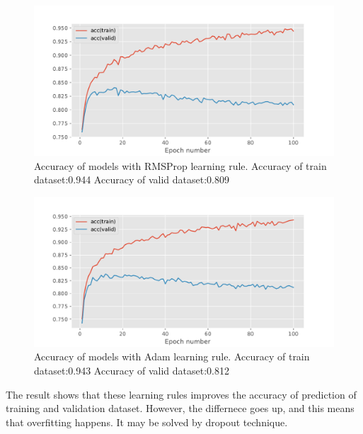 \documentclass{article}
\begin{document}
\begin{figure}[h]
\vskip 5mm
\begin{center}
\centerline{\includegraphics[width=\columnwidth]{d.pdf}}
\caption{Accuracy of models with RMSProp learning rule.
Accuracy of train dataset:0.944
Accuracy of valid dataset:0.809
}

\end{center}
\vskip -5mm
\end{figure}

\begin{figure}[h]
\vskip 5mm
\begin{center}
\centerline{\includegraphics[width=\columnwidth]{e.pdf}}
\caption{Accuracy of models with Adam learning rule. \n
Accuracy of train dataset:0.943 \n
Accuracy of valid dataset:0.812
}
\end{center}
\vskip -5mm
\end{figure}

The result shows that these learning rules improves the accuracy of prediction of training and validation dataset. However, the differnece goes up, and this means that overfitting happens. It may be solved by dropout technique.
\end{document}
